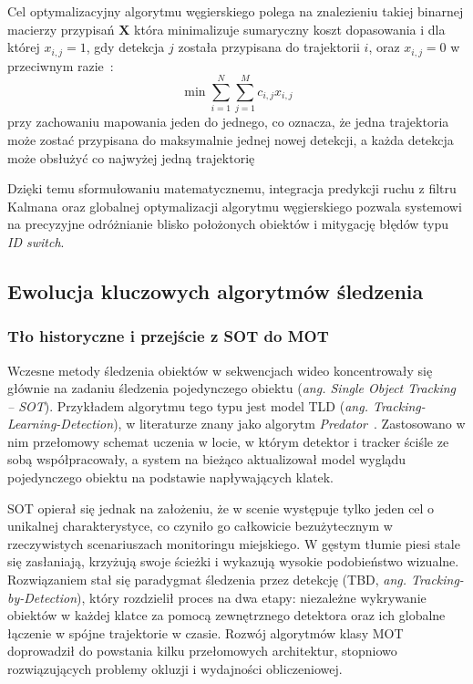Cel optymalizacyjny algorytmu węgierskiego polega na znalezieniu takiej binarnej macierzy przypisań
$\mathbf{X}$ która minimalizuje sumaryczny koszt dopasowania i dla której $x_{i,j} = 1$, gdy
detekcja $j$ została przypisana do trajektorii $i$, oraz $x_{i,j} = 0$ w przeciwnym
razie~\cite{kuhn1955, ristani2016}:
\begin{equation}
  \min \sum_{i=1}^{N} \sum_{j=1}^{M} c_{i,j} x_{i,j}
\end{equation}
przy zachowaniu mapowania jeden do jednego, co oznacza, że jedna trajektoria może zostać przypisana do maksymalnie jednej nowej detekcji, a każda detekcja może obsłużyć co najwyżej jedną trajektorię~\cite{kuhn1955}

Dzięki temu sformułowaniu matematycznemu, integracja predykcji ruchu z filtru Kalmana oraz
globalnej optymalizacji algorytmu węgierskiego pozwala systemowi na precyzyjne odróżnianie blisko
położonych obiektów i mitygację błędów typu \textit{ID switch}.

\subsection{Ewolucja kluczowych algorytmów śledzenia}

\subsubsection{Tło historyczne i przejście z SOT do MOT}

Wczesne metody śledzenia obiektów w sekwencjach wideo koncentrowały się głównie na zadaniu
śledzenia pojedynczego obiektu (\textit{ang. Single Object Tracking -- SOT}). Przykładem algorytmu
tego typu jest model TLD (\textit{ang. Tracking-Learning-Detection}), w literaturze znany jako
algorytm \textit{Predator}~\cite{kalal2012tld}. Zastosowano w nim przełomowy schemat uczenia w
locie, w którym detektor i tracker ściśle ze sobą współpracowały, a system na bieżąco aktualizował
model wyglądu pojedynczego obiektu na podstawie napływających klatek.

SOT opierał się jednak na założeniu, że w scenie występuje tylko jeden cel o unikalnej
charakterystyce, co czyniło go całkowicie bezużytecznym w rzeczywistych scenariuszach monitoringu
miejskiego. W gęstym tłumie piesi stale się zasłaniają, krzyżują swoje ścieżki i wykazują wysokie
podobieństwo wizualne. Rozwiązaniem stał się paradygmat śledzenia przez detekcję (TBD, \textit{ang.
  Tracking-by-Detection}), który rozdzielił proces na dwa etapy: niezależne wykrywanie obiektów w
każdej klatce za pomocą zewnętrznego detektora oraz ich globalne łączenie w spójne trajektorie w
czasie. Rozwój algorytmów klasy MOT doprowadził do powstania kilku przełomowych architektur,
stopniowo rozwiązujących problemy okluzji i wydajności obliczeniowej.

